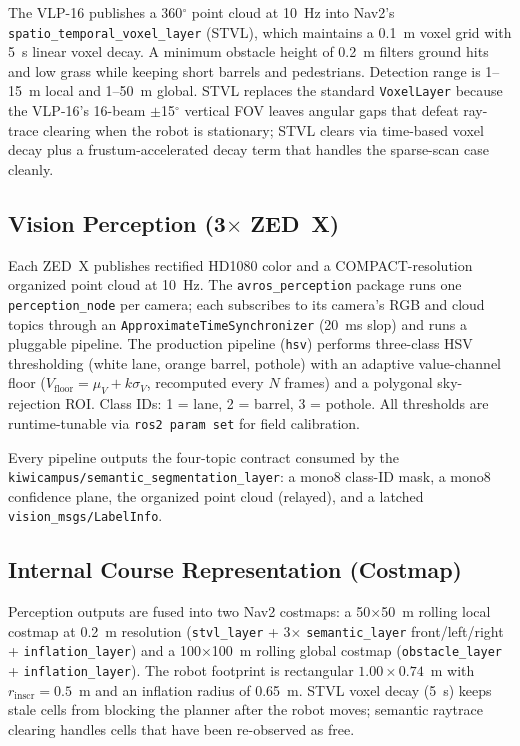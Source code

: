 \documentclass[12pt, letterpaper]{article}
\begin{document}
The VLP-16 publishes a 360$^\circ$ point cloud at 10~Hz into Nav2's
\texttt{spatio\_temporal\_voxel\_layer} (STVL), which maintains a 0.1~m voxel grid with
5~s linear voxel decay. A minimum obstacle height of 0.2~m filters ground hits and low
grass while keeping short barrels and pedestrians. Detection range is 1--15~m local and
1--50~m global. STVL replaces the standard \texttt{VoxelLayer} because the VLP-16's
16-beam $\pm$15$^\circ$ vertical FOV leaves angular gaps that defeat ray-trace clearing
when the robot is stationary; STVL clears via time-based voxel decay plus a
frustum-accelerated decay term that handles the sparse-scan case cleanly.

\subsection{Vision Perception (3$\times$ ZED~X)}

Each ZED~X publishes rectified HD1080 color and a COMPACT-resolution organized point
cloud at 10~Hz. The \texttt{avros\_perception} package runs one \texttt{perception\_node}
per camera; each subscribes to its camera's RGB and cloud topics through an
\texttt{ApproximateTimeSynchronizer} (20~ms slop) and runs a pluggable pipeline. The
production pipeline (\texttt{hsv}) performs three-class HSV thresholding (white lane,
orange barrel, pothole) with an adaptive value-channel floor
($V_{\text{floor}} = \mu_V + k\sigma_V$, recomputed every $N$ frames) and a polygonal
sky-rejection ROI. Class IDs: 1 = lane, 2 = barrel, 3 = pothole. All thresholds are
runtime-tunable via \texttt{ros2 param set} for field calibration.

Every pipeline outputs the four-topic contract consumed by the
\texttt{kiwicampus/semantic\_segmentation\_layer}: a mono8 class-ID mask, a mono8
confidence plane, the organized point cloud (relayed), and a latched
\texttt{vision\_msgs/LabelInfo}.

\subsection{Internal Course Representation (Costmap)}

Perception outputs are fused into two Nav2 costmaps: a 50$\times$50~m rolling local
costmap at 0.2~m resolution (\texttt{stvl\_layer} + 3$\times$ \texttt{semantic\_layer}
front/left/right + \texttt{inflation\_layer}) and a 100$\times$100~m rolling global
costmap (\texttt{obstacle\_layer} + \texttt{inflation\_layer}). The robot footprint is
rectangular $1.00 \times 0.74$~m with $r_{\text{inscr}} = 0.5$~m and an inflation radius
of 0.65~m. STVL voxel decay (5~s) keeps stale cells from blocking the planner after the
robot moves; semantic raytrace clearing handles cells that have been re-observed as
free.
\end{document}
